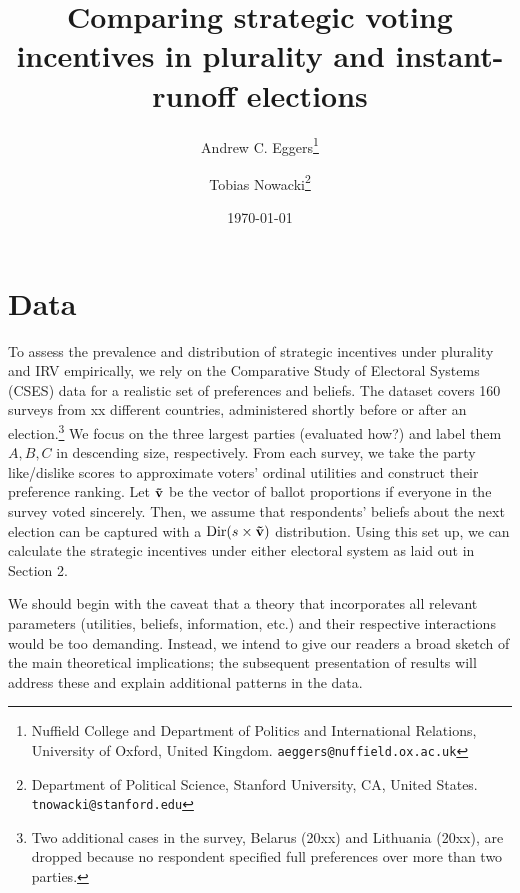 \documentclass[12pt, letter]{article}
\begin{document}
\author{Andrew C. Eggers\thanks{Nuffield College and Department of Politics and International Relations, University of Oxford, United Kingdom. \texttt{aeggers@nuffield.ox.ac.uk}}
\and
Tobias Nowacki\thanks{Department of Political Science, Stanford University, CA, United States. \texttt{tnowacki@stanford.edu}}}
\date{\today}
\title{Comparing strategic voting incentives in plurality and instant-runoff elections}

\maketitle

\onehalfspacing %

\setcounter{section}{4}

\section{Data}

To assess the prevalence and distribution of strategic incentives under plurality and IRV empirically, we rely on the Comparative Study of Electoral Systems (CSES) data for a realistic set of preferences and beliefs. The dataset covers 160 surveys from xx different countries, administered shortly before or after an election.\footnote{Two additional cases in the survey, Belarus (20xx) and Lithuania (20xx), are dropped because no respondent specified full preferences over more than two parties.} We focus on the three largest parties (evaluated how?) and label them $A, B, C$ in descending size, respectively. From each survey, we take the party like/dislike scores to approximate voters' ordinal utilities and construct their preference ranking. Let $\bf \tilde{v}$ be the vector of ballot proportions if everyone in the survey voted sincerely. Then, we assume that respondents' beliefs about the next election can be captured with a $\text{Dir}(s \times \bf \tilde{v})$ distribution. Using this set up, we can calculate the strategic incentives under either electoral system as laid out in Section 2.

We should begin with the caveat that a theory that incorporates all relevant parameters (utilities, beliefs, information, etc.) and their respective interactions would be too demanding. Instead, we intend to give our readers a broad sketch of the main theoretical implications; the subsequent presentation of results will address these and explain additional patterns in the data.
\end{document}
